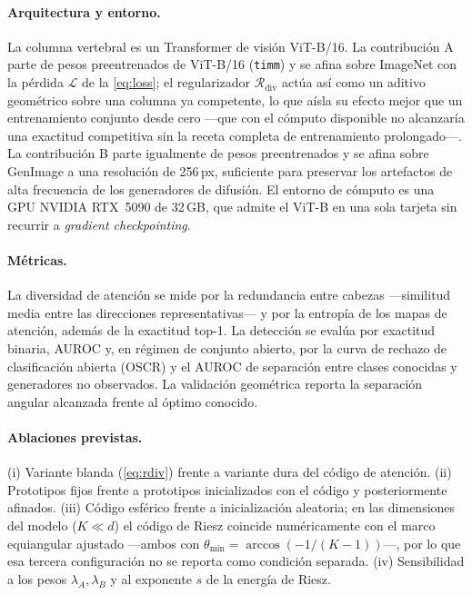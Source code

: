 \documentclass[11pt,a4paper]{article}
\theoremstyle{plain}
\begin{document}
\paragraph{Arquitectura y entorno.}
La columna vertebral es un Transformer de visión ViT-B/16. La
contribución A parte de pesos preentrenados de ViT-B/16 (\texttt{timm})
y se afina sobre ImageNet con la pérdida $\mathcal{L}$ de la
\cref{eq:loss}; el regularizador $\mathcal{R}_{\mathrm{div}}$ actúa así
como un aditivo geométrico sobre una columna ya competente, lo que
aísla su efecto mejor que un entrenamiento conjunto desde cero ---que
con el cómputo disponible no alcanzaría una exactitud competitiva sin
la receta completa de entrenamiento prolongado---. La contribución B
parte igualmente de pesos preentrenados y se afina sobre GenImage a una
resolución de 256\,px, suficiente para preservar los artefactos de alta
frecuencia de los generadores de difusión. El entorno de cómputo es una
GPU NVIDIA RTX~5090 de 32\,GB, que admite el ViT-B en una sola tarjeta
sin recurrir a \emph{gradient checkpointing}.

\paragraph{Métricas.}
La diversidad de atención se mide por la redundancia entre cabezas
---similitud media entre las direcciones representativas--- y por la
entropía de los mapas de atención, además de la exactitud top-1. La
detección se evalúa por exactitud binaria, AUROC y, en régimen de
conjunto abierto, por la curva de rechazo de clasificación abierta
(OSCR) y el AUROC de separación entre clases conocidas y generadores no
observados. La validación geométrica reporta la separación angular
alcanzada frente al óptimo conocido.

\paragraph{Ablaciones previstas.}
(i) Variante blanda (\cref{eq:rdiv}) frente a variante dura del código
de atención. (ii) Prototipos fijos frente a prototipos inicializados con
el código y posteriormente afinados. (iii) Código esférico frente a
inicialización aleatoria; en las dimensiones del modelo ($K\ll d$) el
código de Riesz coincide numéricamente con el marco equiangular
ajustado ---ambos con $\theta_{\min}=\arccos(-1/(K-1))$---, por lo que
esa tercera configuración no se reporta como condición separada. (iv)
Sensibilidad a los pesos $\lambda_A,\lambda_B$ y al exponente $s$ de la
energía de Riesz.
\end{document}
